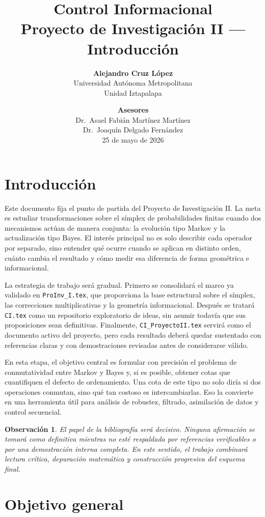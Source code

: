 \documentclass[12pt]{article}
\title{Control Informacional\\
\large Proyecto de Investigación II --- Introducción}
\author{
\textbf{Alejandro Cruz López} \\
Universidad Autónoma Metropolitana \\
Unidad Iztapalapa
}
\date{
\vspace{1em}
\textbf{Asesores} \\[0.3em]
Dr.\ Asael Fabián Martínez Martínez \\
Dr.\ Joaquín Delgado Fernández \\
\vspace{1em}
25 de mayo de 2026
}
\newtheorem{observacion}{Observación}[section]
\begin{document}
\maketitle



\section*{Introducción}

Este documento fija el punto de partida del Proyecto de Investigación II.
La meta es estudiar transformaciones sobre el símplex de probabilidades finitas
cuando dos mecanismos actúan de manera conjunta: la evolución tipo Markov y la
actualización tipo Bayes. El interés principal no es solo describir cada
operador por separado, sino entender qué ocurre cuando se aplican en distinto
orden, cuánto cambia el resultado y cómo medir esa diferencia de forma
geométrica e informacional.

La estrategia de trabajo será gradual. Primero se consolidará el marco ya
validado en \texttt{ProInv\_I.tex}, que proporciona la base estructural sobre el
símplex, las correcciones multiplicativas y la geometría informacional. Después
se tratará \texttt{CI.tex} como un repositorio exploratorio de ideas, sin
asumir todavía que sus proposiciones sean definitivas. Finalmente,
\texttt{CI\_ProyectoII.tex} servirá como el documento activo del proyecto,
pero cada resultado deberá quedar sustentado con referencias claras y con
demostraciones revisadas antes de considerarse válido.

En esta etapa, el objetivo central es formular con precisión el problema de
conmutatividad entre Markov y Bayes y, si es posible, obtener cotas que
cuantifiquen el defecto de ordenamiento. Una cota de este tipo no solo diría si
dos operaciones conmutan, sino qué tan costoso es intercambiarlas. Eso la
convierte en una herramienta útil para análisis de robustez, filtrado,
asimilación de datos y control secuencial.

\begin{observacion}
El papel de la bibliografía será decisivo. Ninguna afirmación se tomará como
definitiva mientras no esté respaldada por referencias verificables o por una
demostración interna completa. En este sentido, el trabajo combinará lectura
crítica, depuración matemática y construcción progresiva del esquema final.
\end{observacion}

\section*{Objetivo general}
\end{document}
